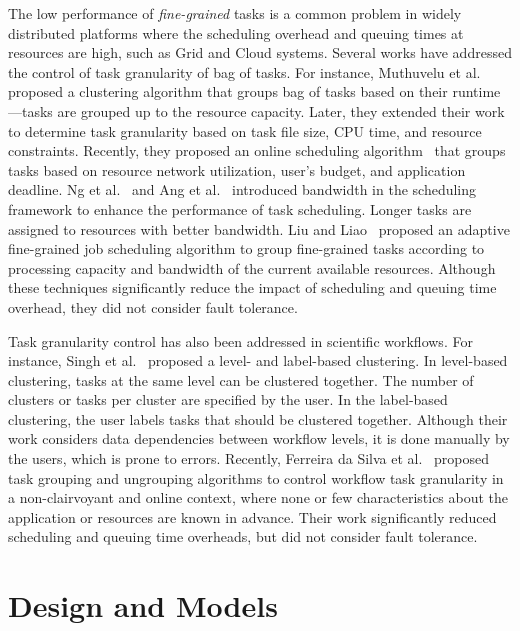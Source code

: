 \documentclass{IOS-Book-Article}
\begin{document}
The low performance of \emph{fine-grained} tasks is a common problem in widely distributed platforms where the scheduling overhead and queuing times at resources are high, such as Grid and Cloud systems. Several works have addressed the control of task granularity of bag of tasks. For instance, Muthuvelu et al.~\cite{Muthuvelu2005} proposed a clustering algorithm that groups bag of tasks based on their runtime---tasks are grouped up to the resource capacity. Later, they extended their work~\cite{4493929} to determine task granularity based on task file size, CPU time, and resource constraints. Recently, they proposed an online scheduling algorithm~\cite{Muthuvelu2010} that groups tasks based on resource network utilization, user's budget, and application deadline. Ng et al.~\cite{Keat2006} and Ang et al.~\cite{Ang2009} introduced bandwidth in the scheduling framework to enhance the performance of task scheduling. Longer tasks are assigned to resources with better bandwidth. Liu and Liao~\cite{Liu2009} proposed an adaptive fine-grained job scheduling algorithm to group fine-grained tasks according to processing capacity and bandwidth of the current available resources. Although these techniques significantly reduce the impact of scheduling and queuing time overhead, they did not consider fault tolerance.

Task granularity control has also been addressed in scientific workflows. For instance, Singh et al.~\cite{Singh2008} proposed a level- and label-based clustering. In level-based clustering, tasks at the same level can be clustered together. The number of clusters or tasks per cluster are specified by the user. In the label-based clustering, the user labels tasks that should be clustered together. Although their work considers data dependencies between workflow levels, it is done manually by the users, which is prone to errors. Recently, Ferreira da Silva et al.~\cite{Ferreira-granularity-2013} proposed task grouping and ungrouping algorithms to control workflow task granularity in a non-clairvoyant and online context, where none or few characteristics about the application or resources are known in advance. Their work significantly reduced scheduling and queuing time overheads, but did not consider fault tolerance.





\section{Design and Models}
\label{sec:models}
\end{document}
